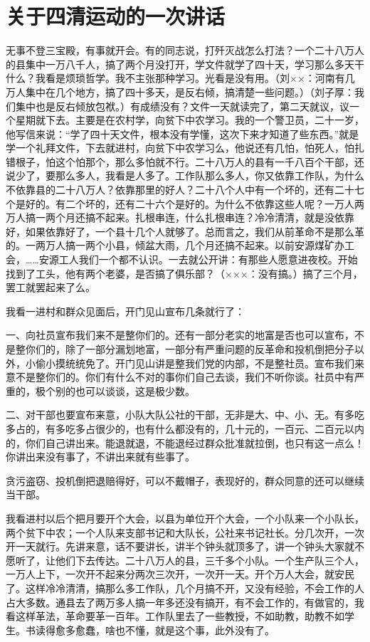 \section[关于四清运动的一次讲话（一九六五年一月三日）]{关于四清运动的一次讲话}


无事不登三宝殿，有事就开会。有的同志说，打歼灭战怎么打法？一个二十八万人的县集中一万八千人，搞了两个月没打开，学文件就学了四十天，学习那么多天干什么？我看是烦琐哲学。我不主张那种学习。光看是没有用。（刘××：河南有几万人集中在几个地方，搞了四十多天，是反右倾，搞清楚一些问题。）（刘子厚：我们集中也是反右倾放包袱。）有成绩没有？文件一天就读完了，第二天就议，议一个星期就下去。主要是在农村学，向贫下中农学习。我的一个警卫员，二十一岁，他写信来说：“学了四十天文件，根本没有学懂，这次下来才知道了些东西。”就是学一个礼拜文件，下去就进村，向贫下中农学习么，他说还有几怕，怕死人，怕扎错根子，怕这个怕那个，那么多怕就不行。二十八万人的县有一千八百个干部，还说少了，要那么多人，我看是人多了。工作队那么多人，你又依靠工作队，为什么不依靠县的二十八万人？依靠那里的好人？二十八个人中有一个坏的，还有二十七个是好的。有二个坏的，还有二十六个是好的。为什么不依靠这些人呢？一万人两万人搞一两个月还搞不起来。扎根串连，什么扎根串连？冷冷清清，就是没依靠好，如果依靠好了，一个县十几个人就够了。总而言之，我们从前革命不是那么革的。一两万人搞一两个小县，倾盆大雨，几个月还搞不起来。以前安源煤矿办工会，……安源工人我们一个都不认识。一去就公开讲：有那些人愿意进夜校。开始找到了工头，他有两个老婆，是否搞了俱乐部？（×××：没有搞。）搞了三个月，罢工就罢起来了么。

我看一进村和群众见面后，开门见山宣布几条就行了：

一、向社员宣布我们来不是整你们的。还有一部分老实的地富是否也可以宣布，不是整你们的，除了一部分漏划地富，一部分有严重问题的反革命和投机倒把分子以外，小偷小摸统统免了。开门见山讲是整我们党的内部，不是整社员。宣布我们来意不是整你们的。你们有什么不对的事你们自己去谈，我们不听你谈。社员中有严重的，极个别的也可以谈谈，这是极少数。

二、对干部也要宣布来意，小队大队公社的干部，无非是大、中、小、无。有多吃多占的，有多吃多占很少的，也有什么都没有的，几十元的，一百元、二百元以内的，你们自己讲出来。能退就退，不能退经过群众批准就拉倒，也只有这一点么！你讲出来没有事了，不讲出来就有些事了。

贪污盗窃、投机倒把退赔得好，可以不戴帽子，表现好的，群众同意的还可以继续当干部。

我看进村以后个把月要开个大会，以县为单位开个大会，一个小队来一个小队长，两个贫下中农；一个人队来支部书记和大队长，公社来书记社长。分几次开，一次开一天就行。先讲来意，话不要讲长，讲半个钟头就顶多了，讲一个钟头大家就不愿听了，让他们下去传达。二十八万人的县，三千多个小队。一个生产队三个人，一万人上下，一次开不起来分两次三次开，一次开一天。开个万人大会，就安民了。这样冷冷清清，搞那么多工作队，几个月搞不开，又没有经验，不会工作的人占大多数。通县去了两万多人搞一年多还没有搞开，有不会工作的，有做官的，我看这样革法，革命要革一百年。工作队里去了一些教授，不如助教，助教不如学生。书读得愈多愈蠢，啥也不懂，就是这个事，此外没有了。

